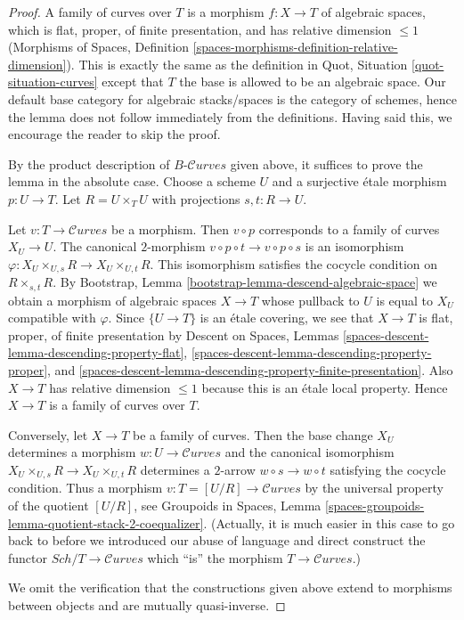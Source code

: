 \documentclass[10pt,a4paper]{amsart}
\theoremstyle{plain}
\theoremstyle{definition}
\theoremstyle{remark}
\numberwithin{equation}{subsection}
\def\Sch{\mathit{Sch}}
\def\Curvesstack{\mathcal{C}\!\mathit{urves}}
\begin{document}
\begin{proof}
A family of curves over $T$ is a morphism $f : X \to T$ of algebraic
spaces, which is flat, proper, of finite presentation, and has
relative dimension $\leq 1$ (Morphisms of Spaces, Definition
\ref{spaces-morphisms-definition-relative-dimension}).
This is exactly the same as the definition in
Quot, Situation \ref{quot-situation-curves}
except that $T$ the base is allowed to be an algebraic space.
Our default base category for algebraic stacks/spaces
is the category of schemes, hence the lemma does not follow
immediately from the definitions. Having said this, we encourage
the reader to skip the proof.

\medskip\noindent
By the product description of $B\text{-}\Curvesstack$ given above,
it suffices to prove the lemma in the absolute case. Choose a scheme
$U$ and a surjective \'etale morphism $p : U \to T$.
Let $R = U \times_T U$ with projections $s, t : R \to U$.

\medskip\noindent
Let $v : T \to \Curvesstack$ be a morphism. Then $v \circ p$
corresponds to a family of curves $X_U \to U$. The canonical
$2$-morphism $v \circ p \circ t \to v \circ p \circ s$
is an isomorphism $\varphi : X_U \times_{U, s} R \to X_U \times_{U, t} R$.
This isomorphism satisfies the cocycle condition on
$R \times_{s, t} R$.
By Bootstrap, Lemma \ref{bootstrap-lemma-descend-algebraic-space}
we obtain a morphism of algebraic spaces $X \to T$
whose pullback to $U$ is equal to $X_U$ compatible with $\varphi$.
Since $\{U \to T\}$ is an \'etale covering, we see that
$X \to T$ is flat, proper, of finite presentation by
Descent on Spaces, Lemmas
\ref{spaces-descent-lemma-descending-property-flat},
\ref{spaces-descent-lemma-descending-property-proper}, and
\ref{spaces-descent-lemma-descending-property-finite-presentation}.
Also $X \to T$ has relative dimension $\leq 1$ because this is
an \'etale local property. Hence $X \to T$ is a family of curves over $T$.

\medskip\noindent
Conversely, let $X \to T$ be a family of curves. Then the
base change $X_U$ determines a morphism $w : U \to \Curvesstack$
and the canonical isomorphism $X_U \times_{U, s} R \to X_U \times_{U, t} R$
determines a $2$-arrow $w \circ s \to w \circ t$ satisfying the
cocycle condition. Thus a morphism $v : T = [U/R] \to \Curvesstack$
by the universal property of the quotient $[U/R]$, see
Groupoids in Spaces, Lemma
\ref{spaces-groupoids-lemma-quotient-stack-2-coequalizer}.
(Actually, it is much easier in this case to go back to before
we introduced our abuse of language and direct construct
the functor $\Sch/T \to \Curvesstack$ which ``is'' the
morphism $T \to \Curvesstack$.)

\medskip\noindent
We omit the verification that the constructions given above
extend to morphisms between objects and are mutually quasi-inverse.
\end{proof}
\end{document}
